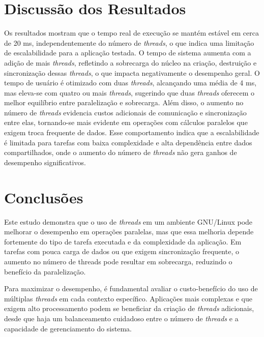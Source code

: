 \documentclass[
	12pt,				%
	oneside,   	        %
	a4paper,			%
	english,			%
	french,				%
	spanish,			%
	brazil,				%
	]{pacotes/abntex2}
\begin{document}
\section{Discussão dos Resultados}
\label{sec:discussao}
Os resultados mostram que o tempo real de execução se mantém estável em cerca de 20 ms, independentemente do número de \textit{threads}, o que indica uma limitação de escalabilidade para a aplicação testada. O tempo de sistema aumenta com a adição de mais \textit{threads}, refletindo a sobrecarga do núcleo na criação, destruição e sincronização dessas \textit{threads}, o que impacta negativamente o desempenho geral. O tempo de usuário é otimizado com duas \textit{threads}, alcançando uma média de 4 ms, mas eleva-se com quatro ou mais \textit{threads}, sugerindo que duas \textit{threads} oferecem o melhor equilíbrio entre paralelização e sobrecarga. Além disso, o aumento no número de \textit{threads} evidencia custos adicionais de comunicação e sincronização entre elas, tornando-se mais evidente em operações com cálculos paralelos que exigem troca frequente de dados. Esse comportamento indica que a escalabilidade é limitada para tarefas com baixa complexidade e alta dependência entre dados compartilhados, onde o aumento do número de \textit{threads} não gera ganhos de desempenho significativos.

\section{Conclusões}
\label{sec:conclusoes}
Este estudo demonstra que o uso de \textit{threads} em um ambiente GNU/Linux pode melhorar o desempenho em operações paralelas, mas que essa melhoria depende fortemente do tipo de tarefa executada e da complexidade da aplicação. Em tarefas com pouca carga de dados ou que exigem sincronização frequente, o aumento no número de threads pode resultar em sobrecarga, reduzindo o benefício da paralelização.

Para maximizar o desempenho, é fundamental avaliar o custo-benefício do uso de múltiplas \textit{threads} em cada contexto específico. Aplicações mais complexas e que exigem alto processamento podem se beneficiar da criação de \textit{threads} adicionais, desde que haja um balanceamento cuidadoso entre o número de \textit{threads} e a capacidade de gerenciamento do sistema.

\postextual
\renewcommand{\bibsection}{%
\section{\bibname}
\bibmark
\prebibhook}


\end{document}
